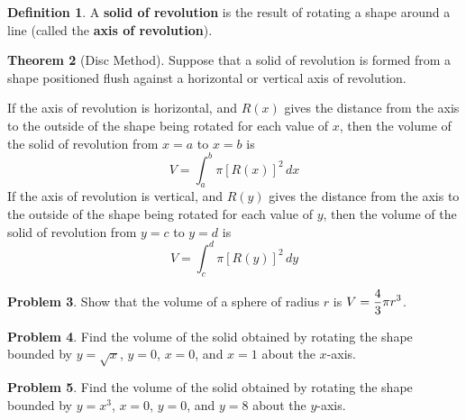 \documentclass[letterpaper, twoside, 12pt]{book}
\theoremstyle{definition}
\newtheorem{theorem}{Theorem}
\theoremstyle{definition}
\newtheorem{definition}[theorem]{Definition}
\newtheorem{problem}[theorem]{Problem}
\newcommand{\ds}{\ensuremath{\displaystyle}}
\begin{document}
\vfill

\newpage

\begin{definition}
  A \textbf{solid of revolution} is the result of rotating a shape around
  a line (called the \textbf{axis of revolution}).
\end{definition}

\begin{theorem}[Disc Method]
  Suppose that a solid of revolution is formed from a shape positioned flush
  against a horizontal or vertical axis of revolution.

  If the axis of revolution is horizontal, and $R(x)$ gives the distance from the
  axis to the outside of the shape being rotated for each value of $x$,
  then the volume of the solid of revolution from $x=a$ to $x=b$ is
  \[
    V = \int_a^b \pi [R(x)]^2\, dx
  \]
  If the axis of revolution is vertical, and $R(y)$ gives the distance from the
  axis to the outside of the shape being rotated for each value of $y$,
  then the volume of the solid of revolution from $y=c$ to $y=d$ is
  \[
    V = \int_c^d \pi [R(y)]^2\, dy
  \]
\end{theorem}

\begin{problem}
 Show that the volume of a sphere of radius $r$ is $\ds V = \frac{4}{3}\pi r^3$.
\end{problem}

\vfill

\newpage

\begin{problem}
 Find the volume of the solid obtained by rotating the shape bounded by
 $y=\sqrt{x}$, $y=0$, $x=0$, and $x=1$ about the $x$-axis.
\end{problem}

\vfill

\begin{problem}
 Find the volume of the solid obtained by rotating the shape bounded by
 $y = x^3$, $x=0$, $y = 0$, and $y=8$ about the $y$-axis.
\end{problem}

\vfill

\newpage
\end{document}
